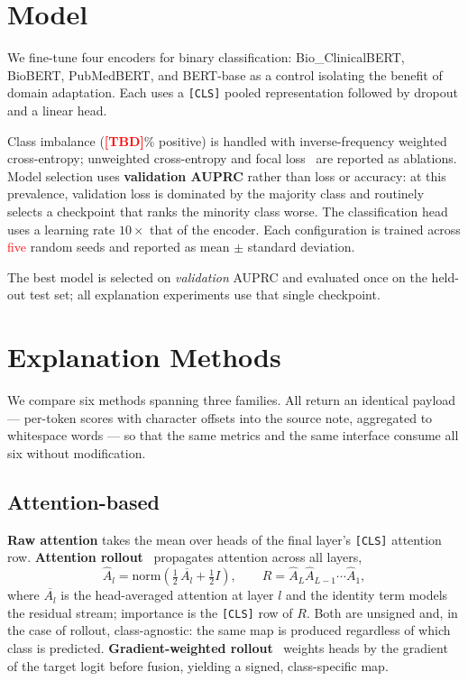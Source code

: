 \documentclass[conference]{IEEEtran}
\newif\ifdraftnums\draftnumstrue   %
\newcommand{\TBD}{\ifdraftnums\textcolor{red}{\textbf{[TBD]}}\else--\fi}
\newcommand{\ph}[1]{\ifdraftnums\textcolor{red}{#1}\else#1\fi}
\begin{document}
\section{Model}\label{sec:model}

We fine-tune four encoders for binary classification: Bio\_ClinicalBERT,
BioBERT, PubMedBERT, and BERT-base as a control isolating the benefit of domain
adaptation. Each uses a \texttt{[CLS]} pooled representation followed by dropout
and a linear head.

Class imbalance (\TBD\% positive) is handled with inverse-frequency weighted
cross-entropy; unweighted cross-entropy and focal loss~\cite{lin2017} are
reported as ablations. Model selection uses \textbf{validation AUPRC} rather than
loss or accuracy: at this prevalence, validation loss is dominated by the
majority class and routinely selects a checkpoint that ranks the minority class
worse. The classification head uses a learning rate $10\times$ that of the
encoder. Each configuration is trained across \ph{five} random seeds and reported
as mean $\pm$ standard deviation.

The best model is selected on \emph{validation} AUPRC and evaluated once on the
held-out test set; all explanation experiments use that single checkpoint.

\section{Explanation Methods}\label{sec:methods}

We compare six methods spanning three families. All return an identical payload
--- per-token scores with character offsets into the source note, aggregated to
whitespace words --- so that the same metrics and the same interface consume all
six without modification.

\subsection{Attention-based}
\textbf{Raw attention} takes the mean over heads of the final layer's
\texttt{[CLS]} attention row. \textbf{Attention rollout}~\cite{abnar2020}
propagates attention across all layers,
\begin{equation}
\hat{A}_l = \mathrm{norm}\!\left(\tfrac{1}{2}\,\overline{A_l} + \tfrac{1}{2}I\right),
\qquad
R = \hat{A}_L \hat{A}_{L-1} \cdots \hat{A}_1,
\end{equation}
where $\overline{A_l}$ is the head-averaged attention at layer $l$ and the
identity term models the residual stream; importance is the \texttt{[CLS]} row of
$R$. Both are unsigned and, in the case of rollout, class-agnostic: the same map
is produced regardless of which class is predicted.
\textbf{Gradient-weighted rollout}~\cite{chefer2021} weights heads by the
gradient of the target logit before fusion, yielding a signed, class-specific map.
\end{document}
